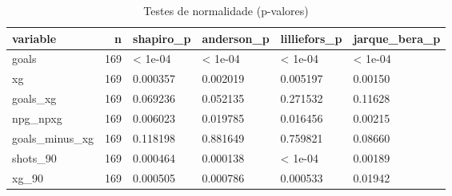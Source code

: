\begin{table}

\caption{\label{tab:normalidade_g20}Testes de normalidade (p-valores)}
\centering
\begin{tabular}[t]{lrllll}
\toprule
variable & n & shapiro\_p & anderson\_p & lilliefors\_p & jarque\_bera\_p\\
\midrule
goals & 169 & < 1e-04 & < 1e-04 & < 1e-04 & < 1e-04\\
xg & 169 & 0.000357 & 0.002019 & 0.005197 & 0.00150\\
goals\_xg & 169 & 0.069236 & 0.052135 & 0.271532 & 0.11628\\
npg\_npxg & 169 & 0.006023 & 0.019785 & 0.016456 & 0.00215\\
goals\_minus\_xg & 169 & 0.118198 & 0.881649 & 0.759821 & 0.08660\\
\addlinespace
shots\_90 & 169 & 0.000464 & 0.000138 & < 1e-04 & 0.00189\\
xg\_90 & 169 & 0.000505 & 0.000786 & 0.000533 & 0.01942\\
\bottomrule
\end{tabular}
\end{table}
